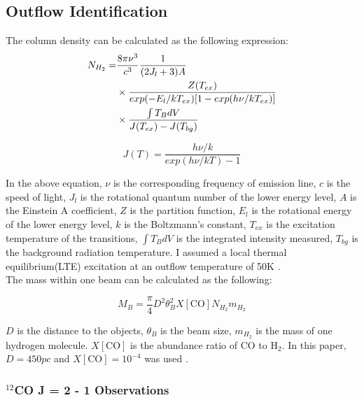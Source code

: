 \documentclass[twoside,11pt]{gshs_thesis}
\begin{document}
\subsection{Outflow Identification}

The column density can be calculated as the following expression:
\begin{align}
N_{H_2} =& \frac{8\pi \nu^3}{c^3} \frac{1}{(2J_l +3)A}  \notag \\
& \times \frac{Z(T_{ex})}{exp(-E_l / kT_{ex})[1-exp(h\nu / kT_{ex})]} \notag \\
& \times \frac{\int T_B dV}{J(T_{ex})-J(T_{bg})}
\end{align}

\begin{equation}
	J(T) = \frac{h \nu / k}{exp(h\nu / kT)-1}
\end{equation}

In the above equation, $\nu$ is the corresponding frequency of emission line, $c$ is the speed of light, $J_l$ is the rotational quantum number of the lower energy level, $A$ is the Einstein A coefficient, $Z$ is the partition function, $E_l$ is the rotational energy of the lower energy level, $k$ is the Boltzmann's constant, $T_{ex}$ is the excitation temperature of the transitions, $\int T_B dV$ is the integrated intensity measured, $T_{bg}$ is the background radiation temperature. I assumed a local thermal equilibrium(LTE) excitation at an outflow temperature of 50K \cite{Takahashi}.\\

The mass within one beam can be calculated as the following:

\begin{equation}
M_B =  \frac{\pi}{4} D^2 \theta_B ^2 X[\textrm{CO}] N_{H_2} m_{H_2}
\end{equation}

$D$ is the distance to the objects, $\theta_B$ is the beam size, $m_{H_2}$ is the mass of one hydrogen molecule. $X[\textrm{CO}]$ is the abundance ratio of CO to $\textrm{H}_2$. In this paper, $D = 450pc$ and $X[\textrm{CO}] = 10^{-4}$ was used \cite{Hatchell2}.\\



\subsubsection{$^{12}$CO J = 2 - 1 Observations}
\end{document}

